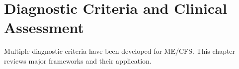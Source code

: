 \chapter{Diagnostic Criteria and Clinical Assessment}
\label{ch:diagnostic-criteria}

Multiple diagnostic criteria have been developed for ME/CFS. This chapter reviews major frameworks and their application.

















